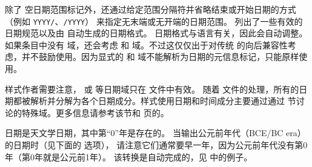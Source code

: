 除了  空日期范围标记外，还通过给定范围分隔符并省略结束或开始日期的方式（例如 \texttt{YYYY/}、\texttt{/YYYY}）
来指定无末端或无开端的日期范围。 列出了一些有效的日期规范以及由 \biblatex 自动生成的日期格式。
日期格式与语言有关，因此会自动调整。如果条目中没有  域，\biblatex 还会考虑  和  域。不过这仅仅出于对传统 \BibTeX 的向后兼容性考虑，并不鼓励使用。因为显式的  和  域不能解析为日期的元信息标记，只能原样使用。

样式作者需要注意， 或   等日期域只在  文件中有效。
随着  文件的处理，所有的日期都被解析并分解为各个日期成分。样式使用日期和时间成分主要通过通过  节讨论的特殊域。更多信息请参考该节和 \pageref{aut:bbx:fld:tab1} 页的。

 日期是天文学日期，其中第“0”年是存在的。
当输出公元前年代（BCE/BC era）的日期时（见下面的  选项），
请注意它们通常要早一年，因为公元前年代没有第0年（第0年就是公元前1年）。
该转换是自动完成的，见 中的例子。

